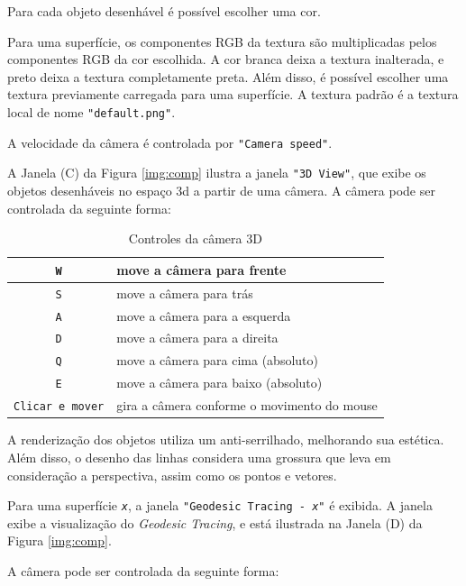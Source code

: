 Para cada objeto desenhável é possível escolher uma cor.

Para uma superfície, os componentes RGB da textura
são multiplicadas pelos componentes RGB da cor escolhida.
A cor branca deixa a textura inalterada,
e preto deixa a textura completamente preta.
Além disso, é possível escolher uma textura previamente carregada para
uma superfície. A textura padrão é a textura local de nome \texttt{"default.png"}.

A velocidade da câmera é controlada por \texttt{"Camera speed"}.

A Janela (C) da Figura \ref{img:comp} ilustra a janela \texttt{"3D View"},
que exibe os objetos desenháveis no espaço 3d a partir de uma câmera.
A câmera pode ser controlada da seguinte forma:

\begin{table}[ht]
\caption{Controles da câmera 3D}
\label{camctrl}
\begin{centering}
\begin{tabularx}{\textwidth}{||c|X||}
    \hline
    \texttt{W} & move a câmera para frente \\
    \hline
    \texttt{S} & move a câmera para trás \\
    \hline
    \texttt{A} & move a câmera para a esquerda \\
    \hline
    \texttt{D} & move a câmera para a direita \\
    \hline
    \texttt{Q} & move a câmera para cima (absoluto) \\
    \hline
    \texttt{E} & move a câmera para baixo (absoluto) \\
    \hline
    \texttt{Clicar e mover} & gira a câmera conforme o movimento do mouse \\
    \hline
\end{tabularx}
\end{centering}
\end{table}

A renderização dos objetos utiliza um anti-serrilhado, melhorando sua estética.
Além disso, o desenho das linhas considera uma grossura que leva
em consideração a perspectiva, assim como os pontos e vetores.

Para uma superfície \texttt{\textit{x}}, a janela \texttt{"Geodesic Tracing - \textit{x}"} é exibida.
A janela exibe a visualização do \textit{Geodesic Tracing},
e está ilustrada na Janela (D) da Figura \ref{img:comp}.

A câmera pode ser controlada da seguinte forma:

